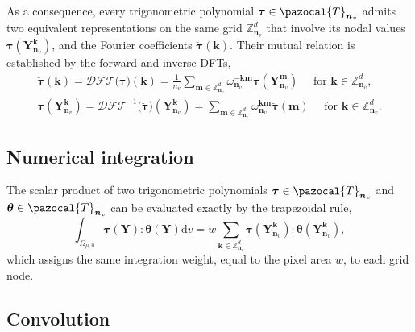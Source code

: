 As a consequence, every trigonometric polynomial \(\bm\tau \in \pazocal{T}_{\bm n_v}\) admits two equivalent representations on the same grid \(\mathbb{Z}_{\bm n_v}^{d}\) that involve its nodal values \(\bm\tau\left(\bm{Y}_{\bm n_v}^{\bm{ k}}\right)\), and the Fourier coefficients \(\breve{\bm{\tau}}(\bm{ k})\).
Their mutual relation is established by the forward and inverse DFTs,
\begin{gather} \label{eq:forward_fft}
\breve{\bm\tau}(\bm{ k})=\mathcal{DFT}\big (\bm \tau\big )(\bm k)=\frac{1}{n_v} \sum_{\bm  m \in \mathbb{Z}_{\bm n_v}^{d}} \omega_{\bm n_v}^{-\bm  k \bm  m} \bm{\tau}\left(\bm{Y}_{\bm n_v}^{\bm  m}\right)\quad \text { for } \bm{ k} \in \mathbb{Z}_{\bm n_v}^{d},\\
\label{eq:backward_fft}
 \bm{\tau}\left(\bm{Y}_{\bm n_v}^{\bm{ k}}\right)=\mathcal{DFT}^{-1}\big (\breve{\bm \tau}\big )(\bm{Y}_{\bm n_v}^{\bm{ k}})=\sum_{\bm  m \in \mathbb{Z}_{\bm n_v}^{d}} \omega_{\bm n_v}^{\bm  k \bm  m} \breve{\bm{\tau}}(\bm{ m})\quad \text { for } \bm{ k} \in \mathbb{Z}_{\bm n_v}^{d}.
\end{gather}

\subsection{Numerical integration}

The scalar product of two trigonometric polynomials \(\bm\tau \in \pazocal{T}_{\bm n_v}\) and \(\bm{\theta} \in \pazocal{T}_{\bm n_v}\) can be evaluated exactly by the trapezoidal rule,
\begin{equation} \label{eq:trapezoidal_rule}
\int_{\Omega_{\mu,0}} \bm\tau(\bm Y): \bm\theta(\bm Y) \mathrm{d} v=w \sum_{\bm{ k} \in \mathbb{Z}_{\bm n_v}^{d}} \bm{\tau}\left(\bm{Y}_{\bm n_v}^{\bm k}\right): \bm{\theta}\left(\bm{Y}_{\bm n_v}^{\bm{ k}}\right),
\end{equation}
which assigns the same integration weight, equal to the pixel area \(w\), to each grid node.

\subsection{Convolution}

